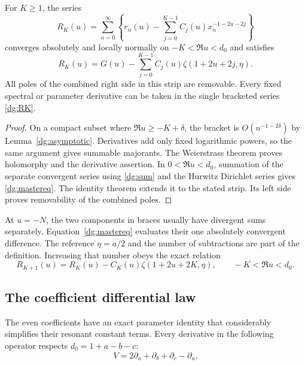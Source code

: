 \begin{theorem}\label{dg:master}
For $K\ge1$, the series
\begin{equation}\label{dg:RK}
 R_K(u)=\sum_{n=0}^{\infty}\left\{r_n(u)-
    \sum_{j=0}^{K-1}C_j(u)x_n^{-1-2u-2j}\right\}
\end{equation}
converges absolutely and locally normally on $-K<\Re u<d_0$ and satisfies
\begin{equation}\label{dg:mastereq}
 \boxed{R_K(u)=G(u)-
       \sum_{j=0}^{K-1}C_j(u)\zeta(1+2u+2j,\eta).}
\end{equation}
All poles of the combined right side in this strip are removable.
Every fixed spectral or parameter derivative can be taken in the
single bracketed series \eqref{dg:RK}.
\end{theorem}
\begin{proof}
On a compact subset where $\Re u\ge-K+\delta$, the bracket is
$O(n^{-1-2\delta})$ by Lemma~\ref{dg:asymptotic}. Derivatives add only
fixed logarithmic powers, so the same argument gives summable
majorants. The Weierstrass theorem proves holomorphy and the derivative
assertion. In $0<\Re u<d_0$, summation of the separate convergent
series using \eqref{dg:sum} and the Hurwitz Dirichlet series gives
\eqref{dg:mastereq}. The identity theorem extends it to the stated
strip. Its left side proves removability of the combined poles.
\end{proof}

\begin{remark}\label{dg:ordinary}
At $u=-N$, the two components in braces usually have divergent sums
separately. Equation~\eqref{dg:mastereq} evaluates their one absolutely
convergent difference. The reference $\eta=a/2$ and the number of
subtractions are part of the definition. Increasing that number obeys
the exact relation
\[
 R_{K+1}(u)=R_K(u)-C_K(u)\zeta(1+2u+2K,\eta),
 \qquad -K<\Re u<d_0.
\]
\end{remark}

\subsection{The coefficient differential law}
The even coefficients have an exact parameter identity that considerably
simplifies their resonant constant terms. Every derivative in the
following operator respects $d_0=1+a-b-c$:
\[
 V=2\partial_a+\partial_b+\partial_c-\partial_u.
\]

